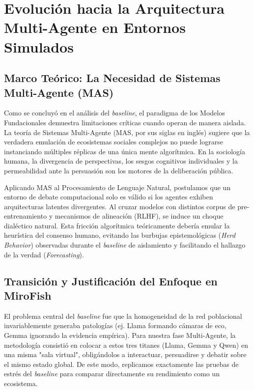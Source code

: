 ﻿\documentclass{article}
\begin{document}
\section{Evolución hacia la Arquitectura Multi-Agente en Entornos Simulados}


\subsection{Marco Teórico: La Necesidad de Sistemas Multi-Agente (MAS)}

Como se concluyó en el análisis del \textit{baseline}, el paradigma de los Modelos Fundacionales demuestra limitaciones críticas cuando operan de manera aislada. La teoría de Sistemas Multi-Agente (MAS, por sus siglas en inglés) sugiere que la verdadera emulación de ecosistemas sociales complejos no puede lograrse instanciando múltiples réplicas de una única mente algorítmica. En la sociología humana, la divergencia de perspectivas, los sesgos cognitivos individuales y la permeabilidad ante la persuasión son los motores de la deliberación pública. 

Aplicando MAS al Procesamiento de Lenguaje Natural, postulamos que un entorno de debate computacional solo es válido si los agentes exhiben arquitecturas latentes divergentes. Al cruzar modelos con distintos corpus de pre-entrenamiento y mecanismos de alineación (RLHF), se induce un choque dialéctico natural. Esta fricción algorítmica teóricamente debería emular la heurística del consenso humano, evitando las burbujas epistemológicas (\textit{Herd Behavior}) observadas durante el \textit{baseline} de aislamiento y facilitando el hallazgo de la verdad (\textit{Forecasting}).

\subsection{Transición y Justificación del Enfoque en MiroFish}

El problema central del \textit{baseline} fue que la homogeneidad de la red poblacional invariablemente generaba patologías (ej. Llama formando cámaras de eco, Gemma ignorando la evidencia empírica). Para nuestra fase Multi-Agente, la metodología consistió en colocar a estos tres titanes (Llama, Gemma y Qwen) en una misma "sala virtual", obligándolos a interactuar, persuadirse y debatir sobre el mismo estado global. De este modo, replicamos exactamente las pruebas de estrés del \textit{baseline} para comparar directamente su rendimiento como un ecosistema.
\end{document}
